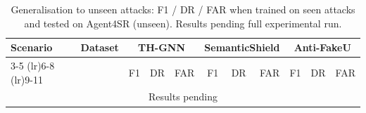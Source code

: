 \begin{table}[t]
\centering
\caption{Generalisation to unseen attacks: F1 / DR / FAR when trained on seen attacks and tested on Agent4SR (unseen). Results pending full experimental run.}
\label{tab:generalisation}
\begin{tabular}{llrrrrrrrrr}
\toprule
Scenario & Dataset & \multicolumn{3}{c}{TH-GNN} & \multicolumn{3}{c}{SemanticShield} & \multicolumn{3}{c}{Anti-FakeU} \\
\cmidrule(lr){3-5} \cmidrule(lr){6-8} \cmidrule(lr){9-11}
 & & F1 & DR & FAR & F1 & DR & FAR & F1 & DR & FAR \\
\midrule
\multicolumn{11}{c}{Results pending} \\
\bottomrule
\end{tabular}
\end{table}
